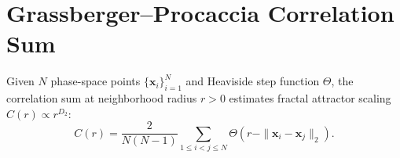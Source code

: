 \documentclass{article}
\begin{document}
\section{Grassberger--Procaccia Correlation Sum}
Given $N$ phase-space points $\{\mathbf{x}_i\}_{i=1}^N$ and Heaviside step function $\Theta$, the correlation sum at neighborhood radius $r > 0$ estimates fractal attractor scaling $C(r) \propto r^{D_2}$:
\begin{equation}
C(r) = \frac{2}{N(N - 1)} \sum_{1 \le i < j \le N} \Theta\!\left(r - \|\mathbf{x}_i - \mathbf{x}_j\|_2\right).
\end{equation}
\end{document}
